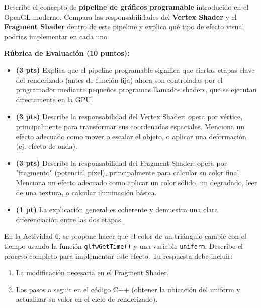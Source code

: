 \documentclass[addpoints,10pt]{exam}
\begin{document}
\begin{questions}
	\question[10]
	Describe el concepto de \textbf{pipeline de gráficos programable} introducido en el OpenGL moderno. Compara las responsabilidades del \textbf{Vertex Shader} y el \textbf{Fragment Shader} dentro de este pipeline y explica qué tipo de efecto visual podrías implementar en cada uno.
	
	\begin{solution}[\stretch{2.5in}]
	\textbf{Rúbrica de Evaluación (10 puntos):}
	\begin{itemize}
		\item \textbf{(3 pts)} Explica que el pipeline programable significa que ciertas etapas clave del renderizado (antes de función fija) ahora son controladas por el programador mediante pequeños programas llamados shaders, que se ejecutan directamente en la GPU.
		\item \textbf{(3 pts)} Describe la responsabilidad del Vertex Shader: opera por vértice, principalmente para transformar sus coordenadas espaciales. Menciona un efecto adecuado como mover o escalar el objeto, o aplicar una deformación (ej. efecto de onda).
		\item \textbf{(3 pts)} Describe la responsabilidad del Fragment Shader: opera por "fragmento" (potencial píxel), principalmente para calcular su color final. Menciona un efecto adecuado como aplicar un color sólido, un degradado, leer de una textura, o calcular iluminación básica.
		\item \textbf{(1 pt)} La explicación general es coherente y demuestra una clara diferenciación entre las dos etapas.
	\end{itemize}
	\end{solution}

	\question[10]
	En la Actividad 6, se propone hacer que el color de un triángulo cambie con el tiempo usando la función \texttt{glfwGetTime()} y una variable \texttt{uniform}. Describe el proceso completo para implementar este efecto. Tu respuesta debe incluir:
	\begin{enumerate}
		\item La modificación necesaria en el Fragment Shader.
		\item Los pasos a seguir en el código C++ (obtener la ubicación del uniform y actualizar su valor en el ciclo de renderizado).
	\end{enumerate}
	

\end{questions}
\end{document}
